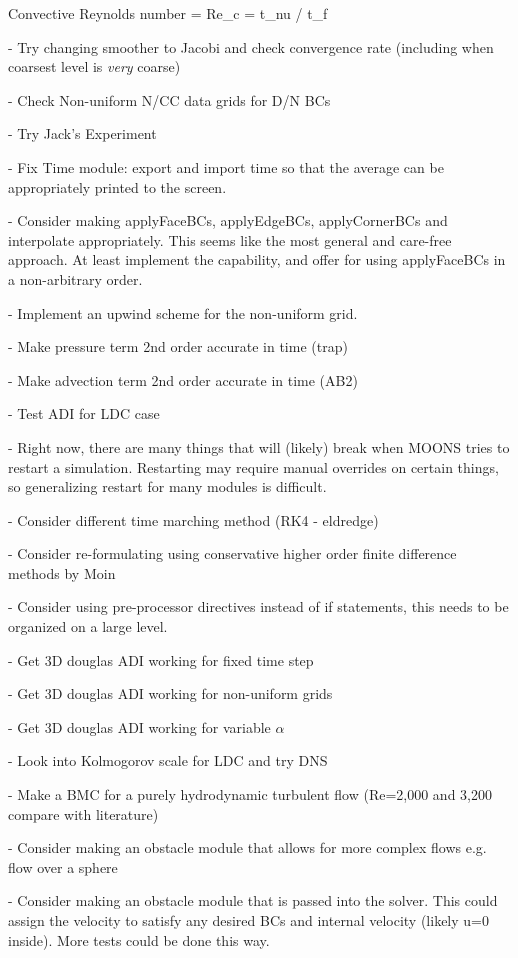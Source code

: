 \documentclass[11pt]{article}
\begin{document}
Convective Reynolds number = Re\_c = t\_nu / t\_f

- Try changing smoother to Jacobi and check convergence rate (including when coarsest level is \textit{very} coarse)

- Check Non-uniform N/CC data grids for D/N BCs

- Try Jack's Experiment

- Fix Time module: export and import time so that the average can be appropriately
printed to the screen.

- Consider making applyFaceBCs, applyEdgeBCs, applyCornerBCs and interpolate appropriately. This seems like the most general and care-free approach. At least implement the capability, and offer for using applyFaceBCs in a non-arbitrary order.

- Implement an upwind scheme for the non-uniform grid.

- Make pressure term 2nd order accurate in time (trap)

- Make advection term 2nd order accurate in time (AB2)

- Test ADI for LDC case

- Right now, there are many things that will (likely) break when MOONS tries to restart a simulation. Restarting may require manual overrides on certain things, so generalizing restart for many modules is difficult.

- Consider different time marching method (RK4 - eldredge)

- Consider re-formulating using conservative higher order finite difference methods by Moin

- Consider using pre-processor directives instead of if statements, this needs to be organized on a large level.

- Get 3D douglas ADI working for fixed time step

- Get 3D douglas ADI working for non-uniform grids

- Get 3D douglas ADI working for variable $\alpha$

- Look into Kolmogorov scale for LDC and try DNS

- Make a BMC for a purely hydrodynamic turbulent flow (Re=2,000 and 3,200 compare with literature)

- Consider making an obstacle module that allows for more complex flows
e.g. flow over a sphere

- Consider making an obstacle module that is passed into the solver.
This could assign the velocity to satisfy any desired BCs and internal
velocity (likely u=0 inside). More tests could be done this way.
\end{document}
